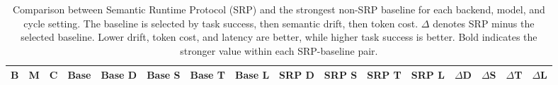 \begin{table}[t]
\centering
\setlength{\tabcolsep}{2pt}
\scriptsize
\begin{tabular}{llrlrrrrrrrrrrrr}
\toprule
B & M & C & Base & Base D & Base S & Base T & Base L & SRP D & SRP S & SRP T & SRP L & $\Delta$D & $\Delta$S & $\Delta$T & $\Delta$L \\
\midrule
\bottomrule
\end{tabular}
\caption{Comparison between Semantic Runtime Protocol (SRP) and the strongest non-SRP baseline for each backend, model, and cycle setting. The baseline is selected by task success, then semantic drift, then token cost. $\Delta$ denotes SRP minus the selected baseline. Lower drift, token cost, and latency are better, while higher task success is better. Bold indicates the stronger value within each SRP-baseline pair.}
\label{tab:srp-camera-ready-table}
\end{table}
